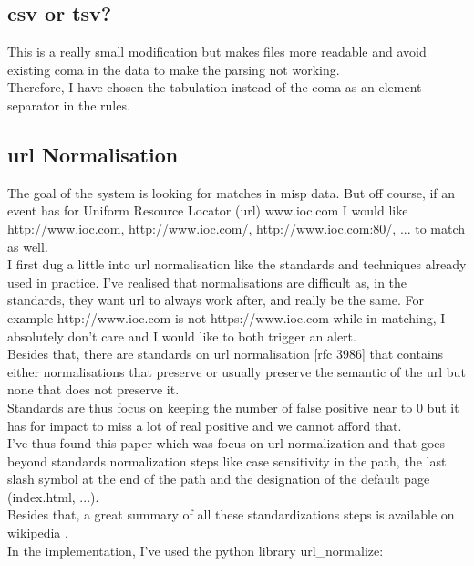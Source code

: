 \documentclass{eplmastersthesis}
\begin{document}
\subsection{\gls{csv} or \gls{tsv}?}
This is a really small modification but makes files more readable and avoid existing coma in the data to make the parsing not working.\\
Therefore, I have chosen the tabulation instead of the coma as an element separator in the rules.

\subsection{\gls{url} Normalisation}
The goal of the system is looking for matches in \gls{misp} data. But off course, if an event has for Uniform Resource Locator (\gls{url}) www.ioc.com I would like http://www.ioc.com, http://www.ioc.com/, http://www.ioc.com:80/, ... to match as well.\\
I first dug a little into \gls{url} normalisation like the standards and techniques already used in practice. I've realised that normalisations are difficult as, in the standards, they want \gls{url} to always work after, and really be the same. For example http://www.ioc.com is not https://www.ioc.com while in matching, I absolutely don't care and I would like to both trigger an alert.\\
Besides that, there are standards on \gls{url} normalisation [\gls{rfc} 3986] that contains either normalisations that preserve or usually preserve the semantic of the \gls{url} but none that does not preserve it.\\
Standards are thus focus on keeping the number of false positive near to 0 but it has for impact to miss a lot of real positive and we cannot afford that.\\
I've thus found this paper \cite{lee2005url} which was focus on \gls{url} normalization and that goes beyond standards normalization steps like case sensitivity in the path, the last slash symbol at the end of the path and the designation of the default page (index.html, ...).\\
Besides that, a great summary of all these standardizations steps is available on wikipedia \cite{wikiNormalizationURL}.\\
In the implementation, I've used the python library url\_normalize:
\end{document}
